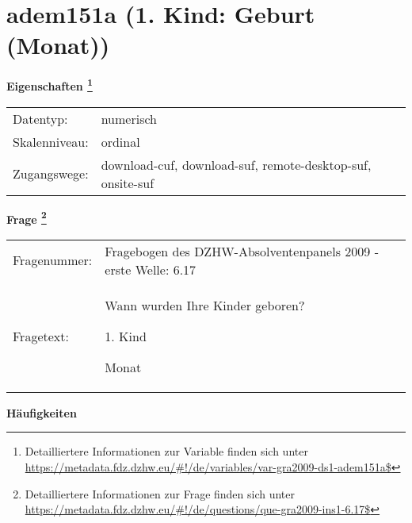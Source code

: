 
    \setcounter{footnote}{0}

    \vspace*{-1.8cm}
	\section{adem151a (1. Kind: Geburt (Monat))}
	\label{section:adem151a}



    \vspace*{0.5cm}
    \noindent\textbf{Eigenschaften
	\footnote{Detailliertere Informationen zur Variable finden sich unter
		\url{https://metadata.fdz.dzhw.eu/\#!/de/variables/var-gra2009-ds1-adem151a$}}}\\
	\begin{tabularx}{\hsize}{@{}lX}
	Datentyp: & numerisch \\
	Skalenniveau: & ordinal \\
	Zugangswege: &
	  download-cuf, 
	  download-suf, 
	  remote-desktop-suf, 
	  onsite-suf
 \\
    \end{tabularx}



				\vspace*{0.5cm}
                \noindent\textbf{Frage
	                \footnote{Detailliertere Informationen zur Frage finden sich unter
		              \url{https://metadata.fdz.dzhw.eu/\#!/de/questions/que-gra2009-ins1-6.17$}}}\\
				\begin{tabularx}{\hsize}{@{}lX}
					Fragenummer: &
					  Fragebogen des DZHW-Absolventenpanels 2009 - erste Welle:
					  6.17
 \\
					Fragetext: & Wann wurden Ihre Kinder geboren?\par  1. Kind\par  Monat \\
				\end{tabularx}





        		\vspace*{0.5cm}
                \noindent\textbf{Häufigkeiten}

